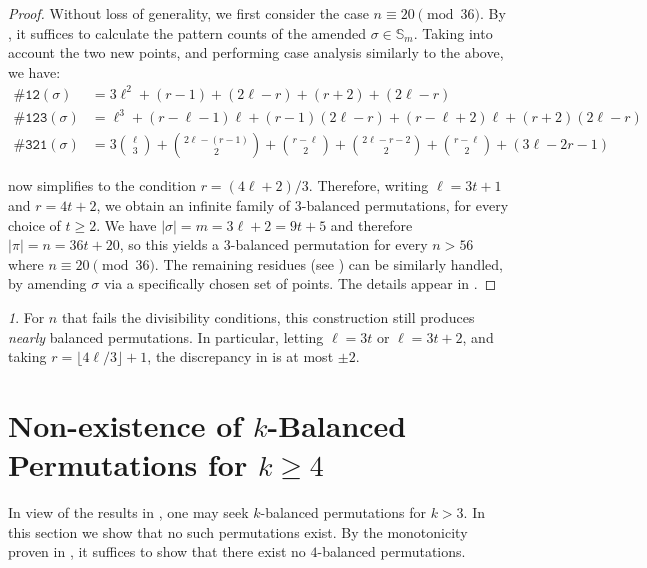 \documentclass{article}
\newcommand{\threeb}{$3$-balanced\xspace}
\newcommand{\pc}[2]{{\# \mathtt{ #1 } \left( #2 \right)}}
\theoremstyle{remark}
\newtheorem{rem}[theorem]{\protect\remarkname}
\providecommand{\remarkname}{Remark}
\theoremstyle{plain}
\begin{document}
\begin{proof}
    Without loss of generality, we first consider the case $n \equiv 20 \pmod {36}$. By , it suffices to calculate the pattern counts of the amended $\sigma\in \mathbb{S}_m$. Taking into account the two new points, and performing case analysis similarly to the above, we have:
    \begin{align*}
        \pc{12}{\sigma} &= 3 \ell^2 + (r - 1) + (2\ell-r) + (r + 2) + (2\ell-r) \\
        \pc{123}{\sigma} &= \ell^{3}+(r-\ell-1)\ell+(r-1)(2\ell-r)+(r-\ell+2)\ell+(r+2)(2\ell-r) \\
        \pc{321}{\sigma} &= 3 \binom{\ell}{3} + \binom{2\ell-(r-1)}{2} + \binom{r-\ell}{2} + \binom{2\ell-r-2}{2} + \binom{r-\ell}{2} + (3\ell - 2r - 1)
    \end{align*}
    
     now simplifies to the condition $r=(4\ell+2)/3$. Therefore, writing $\ell=3t+1$ and $r=4t+2$, we obtain an infinite family of \threeb permutations, for every choice of $t\geq 2$. We have $|\sigma| = m = 3\ell+2=9t+5$ and therefore $|\pi|=n=36t+20$, so this yields a \threeb permutation for every $n > 56$ where $n \equiv 20 \pmod {36}$. The remaining residues (see ) can be similarly handled, by amending $\sigma$ via a specifically chosen set of points. The details appear in .
\end{proof}
\begin{rem}
    For $n$ that fails the divisibility conditions, this construction still produces \emph{nearly} balanced permutations. In particular, letting $\ell=3t$ or $\ell=3t+2$, and taking $r=\lfloor 4\ell/3 \rfloor +1$, the discrepancy in  is at most $\pm 2$.
\end{rem}
 \section{Non-existence of \texorpdfstring{$k$}{k}-Balanced Permutations for \texorpdfstring{$k \ge 4$}{k >= 4}}
\label{section:4balanced_nonex}

In view of the results in , one may seek $k$-balanced permutations for $k>3$. In this section we show that no such permutations exist. By the monotonicity proven in  , it suffices to show that there exist no $4$-balanced permutations. 
\end{document}

